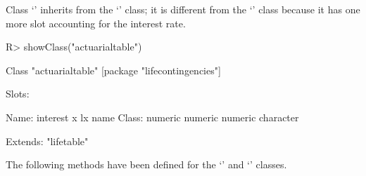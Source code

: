 \documentclass[nojss]{jss}
\begin{document}
Class `' inherits from the `' class; it
is different from the `' class because it has one more
slot accounting for the interest rate.

\begin{Schunk}
\begin{Sinput}
R> showClass("actuarialtable")
\end{Sinput}
\begin{Soutput}
Class "actuarialtable" [package "lifecontingencies"]

Slots:
                                              
Name:   interest         x        lx      name
Class:   numeric   numeric   numeric character

Extends: "lifetable"
\end{Soutput}
\end{Schunk}

The following methods have been defined for the `' and
`' classes.
\end{document}
